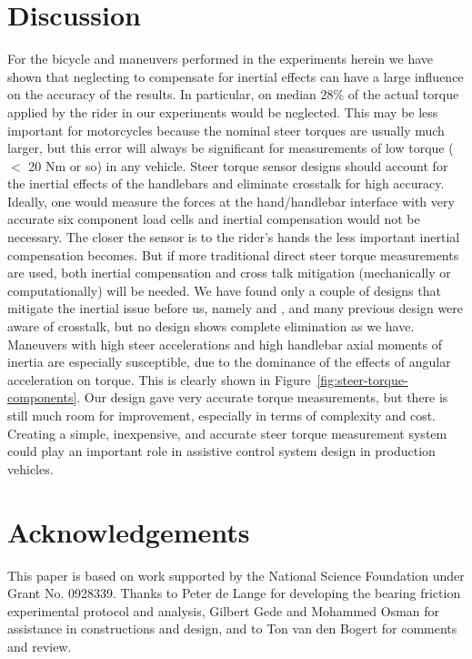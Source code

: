 \documentclass[10pt]{article}
\begin{document}
\section*{Discussion}

For the bicycle and maneuvers performed in the experiments herein we have shown
that neglecting to compensate for inertial effects can have a large influence
on the accuracy of the results. In particular, on median 28\% of the actual
torque applied by the rider in our experiments would be neglected. This may be
less important for motorcycles because the nominal steer torques are usually
much larger, but this error will always be significant for measurements of low
torque ($<$ 20 Nm or so) in any vehicle. Steer torque sensor designs should
account for the inertial effects of the handlebars and eliminate crosstalk for
high accuracy. Ideally, one would measure the forces at the hand/handlebar
interface with very accurate six component load cells and inertial compensation
would not be necessary. The closer the sensor is to the rider's hands the less
important inertial compensation becomes. But if more traditional direct steer
torque measurements are used, both inertial compensation and cross talk
mitigation (mechanically or computationally) will be needed. We have found only
a couple of designs that mitigate the inertial issue before us, namely
\cite{Evertse2010} and \cite{Iuchi2006}, and many previous design were aware of
crosstalk, but no design shows complete elimination as we have. Maneuvers with
high steer accelerations and high handlebar axial moments of inertia are
especially susceptible, due to the dominance of the effects of angular
acceleration on torque. This is clearly shown in
Figure~\ref{fig:steer-torque-components}. Our design gave very accurate torque
measurements, but there is still much room for improvement, especially in terms
of complexity and cost. Creating a simple, inexpensive, and accurate steer
torque measurement system could play an important role in assistive control
system design in production vehicles.

\section*{Acknowledgements}

This paper is based on work supported by the National Science Foundation under
Grant No. 0928339. Thanks to Peter de Lange for developing the bearing friction
experimental protocol and analysis, Gilbert Gede and Mohammed Osman for
assistance in constructions and design, and to Ton van den Bogert for comments
and review.



\end{document}
